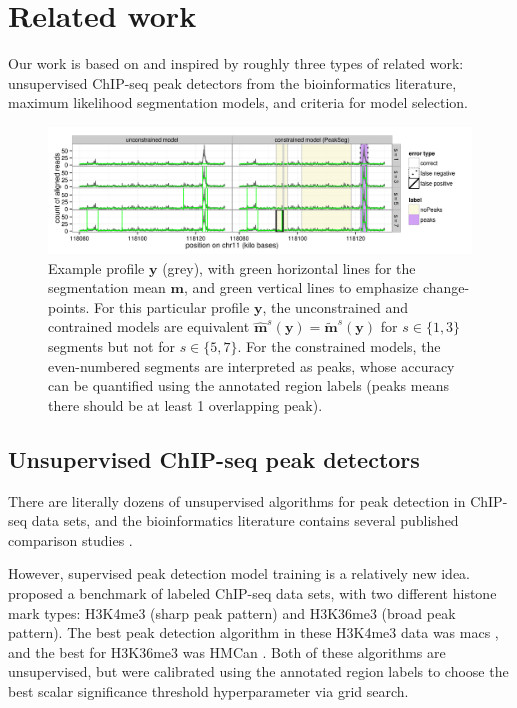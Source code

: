 \documentclass{article}
\begin{document}
\section{Related work}
\label{sec:related}

Our work is based on and inspired by roughly three types of related
work:
unsupervised ChIP-seq peak detectors from the bioinformatics
literature, maximum likelihood segmentation models, 
and criteria for model selection.

\begin{figure}[b!]
  \centering
  \includegraphics[width=\textwidth]{figure-Segmentor-PeakSeg}
  \vskip -0.5cm
  \caption{Example profile $\mathbf y$ (grey), with green horizontal
    lines for the segmentation mean $\mathbf m$, and green vertical
    lines to emphasize change-points. For this particular profile
    $\mathbf y$, the unconstrained and contrained models are
    equivalent $\mathbf{\hat m}^s(\mathbf y) = \mathbf{\tilde
      m}^s(\mathbf y)$ for $s\in\{1, 3\}$ segments but not for
    $s\in\{5, 7\}$. For the constrained models, the even-numbered
    segments are interpreted as peaks, whose accuracy can be
    quantified using the annotated region labels
    (\textcolor{peaks}{peaks} means there should be at least 1
    overlapping peak).}
  \label{fig:Segmentor-PeakSeg}
\end{figure}

\subsection{Unsupervised ChIP-seq peak detectors}

There are literally dozens of unsupervised algorithms for peak
detection in ChIP-seq data sets, and the bioinformatics literature
contains several published comparison studies \citep{evaluation2010,
  rye2010manually, chip-seq-bench}. 

However, supervised peak detection model training is a relatively new
idea. \citet{hocking2014visual} proposed a benchmark of labeled
ChIP-seq data sets, with two different histone mark types: H3K4me3
(sharp peak pattern) and H3K36me3 (broad peak pattern). The best peak
detection algorithm in these H3K4me3 data was macs \citep{MACS}, and
the best for H3K36me3 was HMCan \citep{HMCan}. Both of these
algorithms are unsupervised, but were calibrated using the annotated
region labels to choose the best scalar significance threshold
hyperparameter via grid search.
\end{document}
